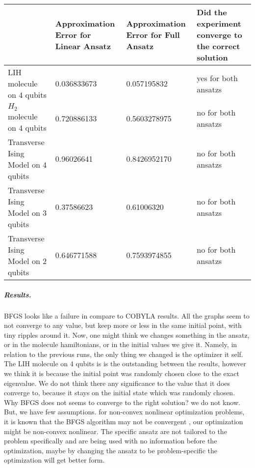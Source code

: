 \documentclass[12pt, a4paper]{article}
\begin{document}
    \begin{tabular}{|p{3cm}|p{3cm}|p{3cm}|p{3cm}|}
        \hline
        & Approximation Error for Linear Ansatz & Approximation Error for Full Ansatz & Did the experiment converge to the correct solution   \\   \hline\hline
        LIH molecule on 4 qubits & 0.036833673 & 0.057195832 & yes for both ansatzs \\  \hline
        $H_2$ molecule on 4 qubits & 0.720886133 & 0.5603278975 & no for both ansatzs \\  \hline
        Transverse Ising Model on 4 qubits & 0.96026641 & 0.8426952170 & no for both ansatzs\\  \hline
        Transverse Ising Model on 3 qubits & 0.37586623 & 0.61006320 & no for both ansatzs\\  \hline
        Transverse Ising Model on 2 qubits & 0.646771588 & 0.7593974855 & no for both ansatzs\\
        \hline
    \end{tabular}

    \subparagraph{Results.}
    \label{sec:bfgs_convergence}
    BFGS looks like a failure in compare to COBYLA results. All the graphs seem to not converge to any value, but keep more or less in the same initial point, with tiny ripples around it. Now, one might think we changes something in the ansatz, or in the molecule hamiltonians, or in the initial values we give it. Namely, in relation to the previous runs, the only thing we changed is the optimizer it self.
    The LIH molecule on 4 qubits is is the outstanding between the results, however we think it is because the initial point was randomly chosen close to the exact eigenvalue.
    We do not think there any significance to the value that it does converge to, because it stays on the initial state which was randomly chosen.
    Why BFGS does not seems to converge to the right solution? we do not know. But, we have few assumptions. for non-convex nonlinear optimization problems, it is known that the BFGS algorithm may not be convergent \cite{yang2022robust}, our optimization might be non-convex nonlinear. The specific ansatz are not tailored to the problem specifically and are being
    used with no information before the optimization, maybe by changing the ansatz to be problem-specific the optimization will get better form.
\end{document}
